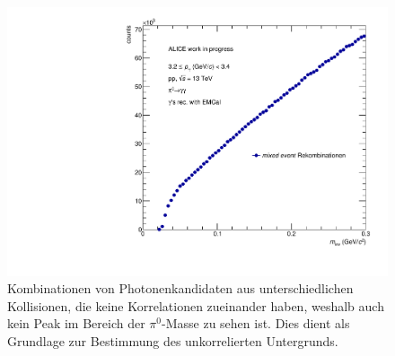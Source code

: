 \begin{figure}[tbp]
\centering
\includegraphics[width=.7\linewidth]{hUncorrBkg.pdf}
\caption{Kombinationen von Photonenkandidaten aus unterschiedlichen Kollisionen, die keine Korrelationen zueinander haben, weshalb auch kein Peak im Bereich der $\pi^{0}$-Masse zu sehen ist. Dies dient als Grundlage zur Bestimmung des unkorrelierten Untergrunds.}
\label{figUncorrBkg}
\end{figure}

